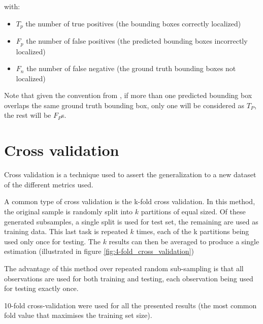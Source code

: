 with:
\begin{itemize}
   \item $T_p$ the number of true positives (the bounding boxes correctly localized)
   \item $F_p$ the number of false positives (the predicted bounding boxes incorrectly localized)
   \item $F_n$ the number of false negative (the ground truth bounding boxes not localized)
\end{itemize}

Note that given the convention from \cite{pascalVoc2012}, if more than one predicted bounding box overlaps the same ground truth bounding box, only one will be considered as $T_P$, the rest will be $F_P$s.

\section{Cross validation}

Cross validation is a technique used to assert the generalization to a new dataset of the different metrics used. 

A common type of cross validation is the k-fold cross validation. In this method, the  original sample is randomly split into $k$ partitions of equal sized. Of these generated subsamples, a single split is used for test set, the remaining are used as training data.
This last task is repeated $k$ times, each of the k partitions being used only once for testing. The $k$ results can then be averaged to produce a single estimation (illustrated in figure  \ref{fig:4-fold_cross_validation})

The advantage of this method over repeated random sub-sampling is that all observations are used for both training and testing, each observation being used for testing exactly once. 

10-fold cross-validation were used for all the presented results (the most common fold value that maximises the training set size).

